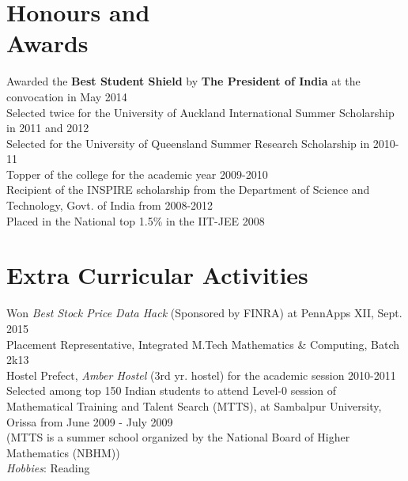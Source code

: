 \documentclass[margin,line]{resume}
\begin{document}
\begin{resume}
\section{\mysidestyle Honours and \\Awards}
			 Awarded the \textbf{Best Student Shield} by \textbf{The President of India} at the convocation in May 2014\vspace{2mm}
			 \\Selected twice for the University of Auckland International Summer Scholarship in 2011 and 2012 \vspace{2mm}
			 \\Selected for the University of Queensland Summer Research Scholarship in 2010-11\vspace{2mm}
			 \\Topper of the college for the academic year 2009-2010\vspace{2mm}
			 \\Recipient of the INSPIRE scholarship from the Department of Science and Technology, Govt. of India from 2008-2012\vspace{2mm}
			 \\Placed in the National top 1.5\% in the IIT-JEE 2008 \vspace{2mm}

\section{\mysidestyle Extra Curricular Activities}
		Won \textit{Best Stock Price Data Hack} (Sponsored by FINRA) at PennApps XII, Sept. 2015\vspace{2mm}
		\\Placement Representative, Integrated M.Tech Mathematics \& Computing, Batch 2k13\vspace{2mm}
		\\Hostel Prefect, \textsl{Amber Hostel} (3rd yr. hostel) for the academic session 2010-2011\vspace{2mm}
		\\Selected among top 150 Indian students to attend Level-0 session of Mathematical Training and Talent Search (MTTS), at Sambalpur University, Orissa from June 2009 - July 2009
		\\(MTTS is a summer school organized by the National Board of Higher Mathematics (NBHM))\vspace{2mm}
		\\\textsl{Hobbies}: Reading

\end{resume}
\end{document}
